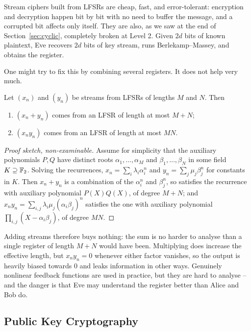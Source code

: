 \documentclass[a4paper]{scrartcl}
\begin{document}
Stream ciphers built from LFSRs are cheap, fast, and error-tolerant: encryption and decryption happen bit by bit with no need to buffer the message, and a corrupted bit affects only itself. They are also, as we saw at the end of Section~\ref{sec:cyclic}, completely broken at Level 2. Given $2d$ bits of known plaintext, Eve recovers $2d$ bits of key stream, runs Berlekamp--Massey, and obtains the register.

One might try to fix this by combining several registers. It does not help very much.

\begin{lemma}\label{lem:combine}
	Let $(x_n)$ and $(y_n)$ be streams from LFSRs of lengths $M$ and $N$. Then
	\begin{enumerate}[label=(\roman*)]
		\item $(x_n+y_n)$ comes from an LFSR of length at most $M+N$;
		\item $(x_ny_n)$ comes from an LFSR of length at most $MN$.
	\end{enumerate}
\end{lemma}

\begin{proof}[Proof sketch, non-examinable]
	Assume for simplicity that the auxiliary polynomials $P,Q$ have distinct roots $\alpha_1,\dots,\alpha_M$ and $\beta_1,\dots,\beta_N$ in some field $K \supseteq \mathbb{F}_2$. Solving the recurrences, $x_n = \sum_i\lambda_i\alpha_i^n$ and $y_n = \sum_j\mu_j\beta_j^n$ for constants in $K$. Then $x_n+y_n$ is a combination of the $\alpha_i^n$ and $\beta_j^n$, so satisfies the recurrence with auxiliary polynomial $P(X)Q(X)$, of degree $M+N$; and $x_ny_n = \sum_{i,j}\lambda_i\mu_j(\alpha_i\beta_j)^n$ satisfies the one with auxiliary polynomial $\prod_{i,j}(X-\alpha_i\beta_j)$, of degree $MN$.
\end{proof}

Adding streams therefore buys nothing: the sum is no harder to analyse than a single register of length $M+N$ would have been. Multiplying does increase the effective length, but $x_ny_n = 0$ whenever either factor vanishes, so the output is heavily biased towards $0$ and leaks information in other ways. Genuinely nonlinear feedback functions are used in practice, but they are hard to analyse -- and the danger is that Eve may understand the register better than Alice and Bob do.

\subsection{Public Key Cryptography}
\end{document}
